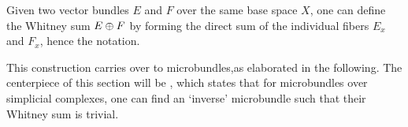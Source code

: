 \begin{myparagraph} Given two vector bundles $E$ and $F$ over the same base space $X$, one can define the Whitney sum $E \oplus{} F$ by forming the direct sum of the individual fibers $E_x$ and $F_x$, hence the notation.

This construction carries over to microbundles,as elaborated in the following. The centerpiece of this section will be , which states that for microbundles over simplicial complexes, one can find an `inverse' microbundle such that their Whitney sum is trivial. \end{myparagraph}   